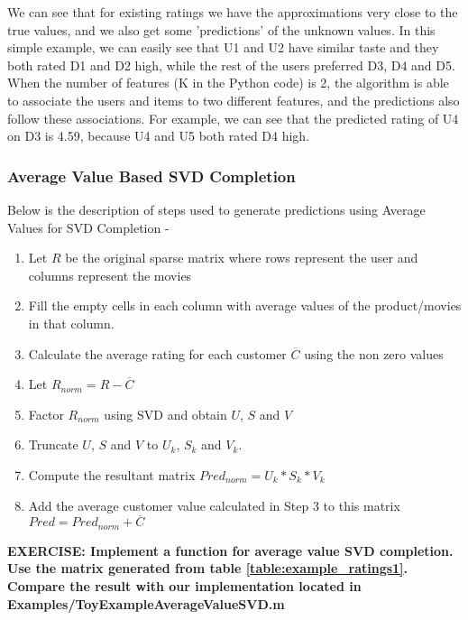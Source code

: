  We can see that for existing ratings we have the approximations very close to the true values, and we also get some 'predictions' of the unknown values. In this simple example, we can easily see that U1 and U2 have similar taste and they both rated D1 and D2 high, while the rest of the users preferred D3, D4 and D5. When the number of features (K in the Python code) is 2, the algorithm is able to associate the users and items to two different features, and the predictions also follow these associations. For example, we can see that the predicted rating of U4 on D3 is 4.59, because U4 and U5 both rated D4 high.

  \subsubsection{Average Value Based SVD Completion}
  Below is the description of steps used to generate predictions using Average Values for SVD Completion -
  \begin{enumerate}
    \item Let $R$ be the original sparse matrix where rows represent the user and columns represent the movies
    \item Fill the empty cells in each column with average values of the product/movies in that column.
    \item Calculate the average rating for each customer $\overline{C}$ using the non zero values
    \item Let $R_{norm} = R - \overline{C}$  
    \item Factor $R_{norm}$ using SVD and obtain $U$, $S$ and $V$
    \item Truncate $U$, $S$ and $V$ to $U_k$, $S_k$ and $V_k$.
    \item Compute the resultant matrix $Pred_{norm} = U_k*S_k*V_k$
    \item Add the average customer value calculated in Step 3 to this matrix $Pred = Pred_{norm} + \overline{C} $
  \end{enumerate}
  \textbf{EXERCISE: Implement a function for average value SVD completion. Use the matrix generated from table \ref{table:example_ratings1}. Compare the result with our implementation located in Examples/ToyExampleAverageValueSVD.m}
